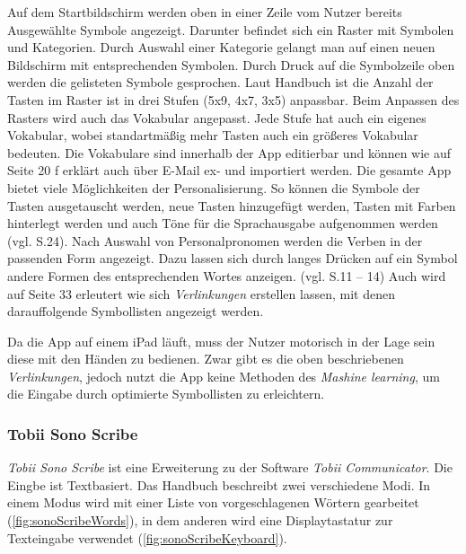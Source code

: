             Auf dem Startbildschirm werden oben in einer Zeile vom Nutzer bereits Ausgewählte Symbole angezeigt. Darunter befindet sich ein Raster mit Symbolen und Kategorien. Durch Auswahl einer Kategorie gelangt man auf einen neuen Bildschirm mit entsprechenden Symbolen.
            Durch Druck auf die Symbolzeile oben werden die gelisteten Symbole gesprochen. 
            Laut Handbuch \parencite[S. 7 ff]{cidar:metaTalkManual} ist die Anzahl der Tasten im Raster ist in drei Stufen (5x9, 4x7, 3x5) anpassbar. Beim Anpassen des Rasters wird auch das Vokabular angepasst. Jede Stufe hat auch ein eigenes Vokabular, wobei standartmäßig mehr Tasten auch ein größeres Vokabular bedeuten. Die Vokabulare sind innerhalb der App editierbar und können wie auf Seite 20 f erklärt auch über E-Mail ex- und importiert werden. Die gesamte App bietet viele Möglichkeiten der Personalisierung. So können die Symbole der Tasten ausgetauscht werden, neue Tasten hinzugefügt werden, Tasten mit Farben hinterlegt werden und auch Töne für die Sprachausgabe aufgenommen werden (vgl. S.24). Nach Auswahl von Personalpronomen werden die Verben in der passenden Form angezeigt. Dazu lassen sich durch langes Drücken auf ein Symbol andere Formen des entsprechenden Wortes anzeigen. (vgl. S.11 – 14) Auch wird auf Seite 33 erleutert wie sich \emph{Verlinkungen} erstellen lassen, mit denen darauffolgende Symbollisten angezeigt werden.
            
            Da die App auf einem iPad läuft, muss der Nutzer motorisch in der Lage sein diese mit den Händen zu bedienen. Zwar gibt es die oben beschriebenen \emph{Verlinkungen}, jedoch nutzt die App keine Methoden des \emph{Mashine learning}, um die Eingabe durch optimierte Symbollisten zu erleichtern.
            
        \subsubsection*{Tobii Sono Scribe}
        
        	\emph{Tobii Sono Scribe} ist eine Erweiterung zu der Software \emph{Tobii Communicator}. Die Eingbe ist Textbasiert. Das Handbuch \parencite[S. 8]{tobii:sonoScribeManual} beschreibt zwei verschiedene Modi. In einem Modus wird mit einer Liste von vorgeschlagenen Wörtern gearbeitet (\autoref{fig:sonoScribeWords}), in dem anderen wird eine Displaytastatur zur Texteingabe verwendet (\autoref{fig:sonoScribeKeyboard}).
            
